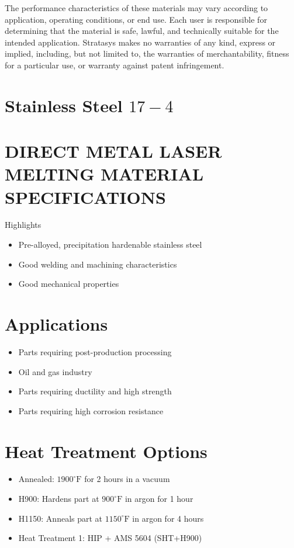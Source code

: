 \documentclass[10pt]{article}
\begin{document}
The performance characteristics of these materials may vary according to application, operating conditions, or end use. Each user is responsible for determining that the material is safe, lawful, and technically suitable for the intended application. Stratasys makes no warranties of any kind, express or implied, including, but not limited to, the warranties of merchantability, fitness for a particular use, or warranty against patent infringement.

\section*{Stainless Steel $17-4$}
\section*{DIRECT METAL LASER MELTING MATERIAL SPECIFICATIONS}
Highlights

\begin{itemize}
  \item Pre-alloyed, precipitation hardenable stainless steel
  \item Good welding and machining characteristics
  \item Good mechanical properties
\end{itemize}

\section*{Applications}
\begin{itemize}
  \item Parts requiring post-production processing

  \item Oil and gas industry

  \item Parts requiring ductility and high strength

  \item Parts requiring high corrosion resistance

\end{itemize}

\section*{Heat Treatment Options}
\begin{itemize}
  \item Annealed: $1900^{\circ} \mathrm{F}$ for 2 hours in a vacuum

  \item H900: Hardens part at $900^{\circ} \mathrm{F}$ in argon for 1 hour

  \item H1150: Anneals part at $1150^{\circ} \mathrm{F}$ in argon for 4 hours

  \item Heat Treatment 1: HIP + AMS 5604 (SHT+H900)

\end{itemize}
\end{document}
